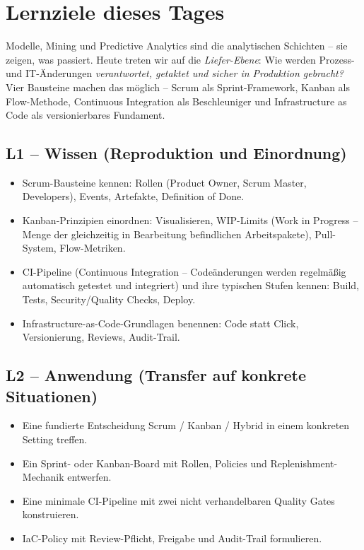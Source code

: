 \documentclass[11pt,a4paper,oneside]{article}
\begin{document}
\section*{Lernziele dieses Tages}
\thispagestyle{plain}

\noindent Modelle, Mining und Predictive Analytics sind die analytischen Schichten -- sie zeigen, was passiert. Heute treten wir auf die \emph{Liefer-Ebene}: Wie werden Prozess- und IT-Änderungen \emph{verantwortet, getaktet und sicher in Produktion gebracht?} Vier Bausteine machen das möglich -- Scrum als Sprint-Framework, Kanban als Flow-Methode, Continuous Integration als Beschleuniger und Infrastructure as Code als versionierbares Fundament.

\subsection*{L1 -- Wissen (Reproduktion und Einordnung)}
\begin{itemize}
  \item Scrum-Bausteine kennen: Rollen (Product Owner, Scrum Master, Developers), Events, Artefakte, Definition of Done.
  \item Kanban-Prinzipien einordnen: Visualisieren, WIP-Limits (Work in Progress -- Menge der gleichzeitig in Bearbeitung befindlichen Arbeitspakete), Pull-System, Flow-Metriken.
  \item CI-Pipeline (Continuous Integration -- Codeänderungen werden regelmäßig automatisch getestet und integriert) und ihre typischen Stufen kennen: Build, Tests, Security/Quality Checks, Deploy.
  \item Infrastructure-as-Code-Grundlagen benennen: Code statt Click, Versionierung, Reviews, Audit-Trail.
\end{itemize}

\subsection*{L2 -- Anwendung (Transfer auf konkrete Situationen)}
\begin{itemize}
  \item Eine fundierte Entscheidung Scrum / Kanban / Hybrid in einem konkreten Setting treffen.
  \item Ein Sprint- oder Kanban-Board mit Rollen, Policies und Replenishment-Mechanik entwerfen.
  \item Eine minimale CI-Pipeline mit zwei nicht verhandelbaren Quality Gates konstruieren.
  \item IaC-Policy mit Review-Pflicht, Freigabe und Audit-Trail formulieren.
\end{itemize}
\end{document}
